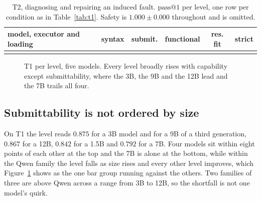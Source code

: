 \documentclass[11pt,a4paper]{article}
\begin{document}
\begin{table}[t]
\centering
\footnotesize
\setlength{\tabcolsep}{3pt}
\caption{T2, diagnosing and repairing an induced fault. $\mathrm{pass}@1$ per level, one row per
condition as in Table~\ref{tab:t1}. Safety is $1.000 \pm 0.000$ throughout and is omitted.}
\label{tab:t2}
\begin{tabular}{lccccc}
\toprule
model, executor and loading & syntax & submit. & functional & res. fit & strict \\
\midrule
 \\
\bottomrule
\end{tabular}
\end{table}

\begin{figure}[t]
\centering
{}
\caption{T1 per level, five models. Every level broadly rises with capability except
submittability, where the 3B, the 9B and the 12B lead and the 7B trails all four.}
\label{fig:t1}
\end{figure}

\subsection{Submittability is not ordered by size}

On T1 the level reads $0.875$ for a 3B model and for a 9B of a third generation, $0.867$ for a 12B,
$0.842$ for a 1.5B and $0.792$ for a 7B. Four models sit within eight points of each other at the
top and the 7B is alone at the bottom, while within the Qwen family the level falls as size rises
and every
other level improves, which Figure~\ref{fig:t1} shows as the one bar group running against the
others. Two families of three are above Qwen across a range from 3B to 12B, so the shortfall is not
one model's quirk.
\end{document}
